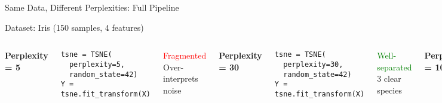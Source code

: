 \documentclass[aspectratio=169]{beamer}
\begin{document}
\begin{frame}{Same Data, Different Perplexities: Full Pipeline}

Dataset: Iris (150 samples, 4 features)

\begin{columns}
\centering
\textbf{Perplexity = 5}

\footnotesize
\texttt{tsne = TSNE(}\\
\texttt{~~perplexity=5,}\\
\texttt{~~random\_state=42)}\\
\texttt{Y = tsne.fit\_transform(X)}

\vspace{0.3cm}

\textcolor{red}{Fragmented}\\
\tiny{Over-interprets noise}

\centering
\textbf{Perplexity = 30}

\footnotesize
\texttt{tsne = TSNE(}\\
\texttt{~~perplexity=30,}\\
\texttt{~~random\_state=42)}\\
\texttt{Y = tsne.fit\_transform(X)}

\vspace{0.3cm}

\textcolor{green}{Well-separated}\\
\tiny{3 clear species}

\centering
\textbf{Perplexity = 100}

\footnotesize
\texttt{tsne = TSNE(}\\
\texttt{~~perplexity=100,}\\
\texttt{~~random\_state=42)}\\
\texttt{Y = tsne.fit\_transform(X)}


\end{columns}
\end{frame}
\end{document}
